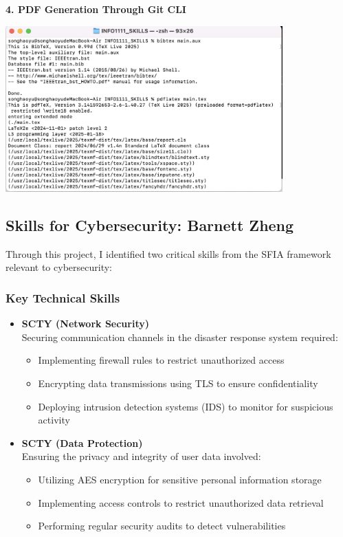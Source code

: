 \documentclass[a4paper, 11pt]{report}
\begin{document}
\textbf{4. PDF Generation Through Git CLI}
\begin{center}
\includegraphics[width=0.8\textwidth]{Jared/git.png}  
\end{center}


\newpage

\subsection{Skills for Cybersecurity: Barnett Zheng}
Through this project, I identified two critical skills from the SFIA framework relevant to cybersecurity:

\subsubsection{Key Technical Skills}
\begin{itemize}
    \item \textbf{SCTY (Network Security)}~\cite{network_security} \\
    Securing communication channels in the disaster response system required:
    \begin{itemize}
        \item Implementing firewall rules to restrict unauthorized access
        \item Encrypting data transmissions using TLS to ensure confidentiality
        \item Deploying intrusion detection systems (IDS) to monitor for suspicious activity
    \end{itemize}

    \item \textbf{SCTY (Data Protection)}~\cite{data_protection} \\
    Ensuring the privacy and integrity of user data involved:
    \begin{itemize}
        \item Utilizing AES encryption for sensitive personal information storage
        \item Implementing access controls to restrict unauthorized data retrieval
        \item Performing regular security audits to detect vulnerabilities
    \end{itemize}
\end{itemize}
\end{document}
